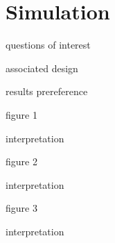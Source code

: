
\section{Simulation}

questions of interest

associated design

results prereference

figure 1

interpretation

figure 2

interpretation

figure 3

interpretation
